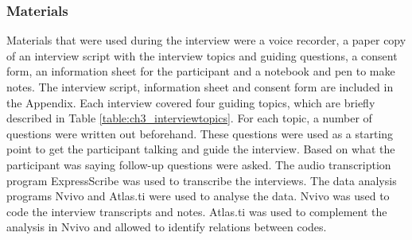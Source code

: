 \subsubsection{Materials}
Materials that were used during the interview were a voice recorder, a paper copy of an interview script with the interview topics and guiding questions, a consent form, an information sheet for the participant and a notebook and pen to make notes. The interview script, information sheet and consent form are included in the Appendix. 
Each interview covered four guiding topics, which are briefly described in Table \ref{table:ch3_interviewtopics}. For each topic, a number of questions were written out beforehand. These questions were used as a starting point to get the participant talking and guide the interview. Based on what the participant was saying follow-up questions were asked. The audio transcription program ExpressScribe was used to transcribe the interviews. The data analysis programs Nvivo and Atlas.ti were used to analyse the data. Nvivo was used to code the interview transcripts and notes. Atlas.ti was used to complement the analysis in Nvivo and allowed to identify relations between codes.

